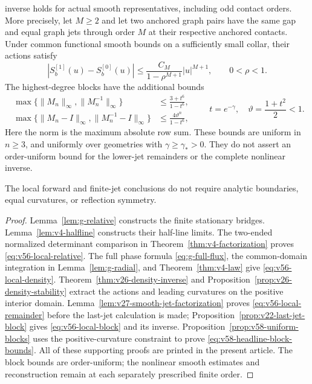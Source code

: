 \begin{theorem}
\begin{enumerate}
inverse holds for actual smooth representatives, including odd contact
orders.  More precisely, let $M\ge2$ and let two anchored graph pairs
have the same gap and equal graph jets through order $M$ at their
respective anchored contacts.  Under common functional smooth bounds
on a sufficiently small collar, their actions satisfy
\begin{equation}\label{eq:v56-local-remainder}
 |S_b^{[1]}(u)-S_b^{[0]}(u)|
       \le \frac{C_M}{1-\rho^{M+1}}|u|^{M+1},\qquad 0<\rho<1.
\end{equation}
The highest-degree blocks have the additional bounds
\begin{equation}\label{eq:v58-headline-block-bounds}
 \begin{split}
 \max\{\|M_n\|_\infty,\|M_n^{-1}\|_\infty\}
       &\le \frac{3+t^6}{1-t^6},\\
 \max\{\|M_n-I\|_\infty,\|M_n^{-1}-I\|_\infty\}
       &\le \frac{4\vartheta^n}{1-t^6},
 \end{split}
 \qquad t=e^{-\gamma},\quad \vartheta=\frac{1+t^2}{2}<1.
\end{equation}
Here the norm is the maximum absolute row sum.  These bounds are uniform
in $n\ge3$, and uniformly over geometries with $\gamma\ge\gamma_*>0$.
They do not assert an order-uniform bound for the lower-jet remainders
or the complete nonlinear inverse.
\end{enumerate}
The local forward and finite-jet conclusions do not require analytic
boundaries, equal curvatures, or reflection symmetry.
\end{theorem}

\begin{proof}
Lemma~\ref{lem:g-relative} constructs the finite stationary bridges.
Lemma~\ref{lem:v4-halfline} constructs their half-line limits.
The two-ended normalized determinant comparison in
Theorem~\ref{thm:v4-factorization} proves
\eqref{eq:v56-local-relative}.  The full phase formula
\eqref{eq:g-full-flux}, the common-domain integration in
Lemma~\ref{lem:g-radial}, and Theorem~\ref{thm:v4-law} give
\eqref{eq:v56-local-density}.  Theorem~\ref{thm:v26-density-inverse}
and Proposition~\ref{prop:v26-density-stability} extract the actions and
leading curvatures on the positive interior domain.
Lemma~\ref{lem:v27-smooth-jet-factorization} proves
\eqref{eq:v56-local-remainder} before the last-jet calculation is made;
Proposition~\ref{prop:v22-last-jet-block} gives
\eqref{eq:v56-local-block} and its inverse.
Proposition~\ref{prop:v58-uniform-blocks} uses the positive-curvature
constraint to prove \eqref{eq:v58-headline-block-bounds}.
All of these supporting proofs are printed in the present article.
The block bounds are order-uniform; the nonlinear smooth estimates
and reconstruction remain at each separately prescribed finite order.
\end{proof}

